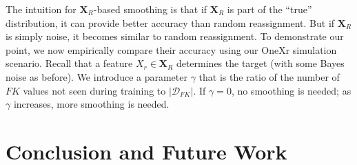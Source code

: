\documentclass[sigconf]{acmart}
\begin{document}
The intuition for $\textbf{X}_R$-based smoothing is that if $\textbf{X}_R$ is part of the ``true'' distribution, it can provide better accuracy 
than random reassignment. But if $\textbf{X}_R$ is simply noise, it becomes similar to random reassignment.
To demonstrate our point, we now empirically compare their accuracy using our OneXr simulation scenario. Recall that a feature $X_r \in \textbf{X}_R$
determines the target (with some Bayes noise as before). We introduce a parameter $\gamma$ that is the ratio of the number of $FK$ values not seen 
during training to $|\mathcal{D}_{FK}|$. If $\gamma = 0$, no smoothing is needed; as $\gamma$ increases, more smoothing is needed.




\section{Conclusion and Future Work}





\end{document}
